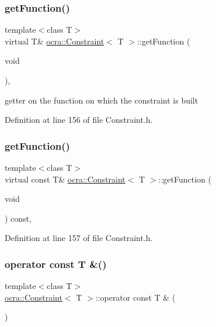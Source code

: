 \subsubsection{\texorpdfstring{get\+Function()}{getFunction()}\hspace{0.1cm}{\footnotesize\ttfamily [1/2]}}
{\footnotesize\ttfamily template$<$class T$>$ \\
virtual T\& \hyperlink{classocra_1_1Constraint}{ocra\+::\+Constraint}$<$ T $>$\+::get\+Function (\begin{DoxyParamCaption}\item[{void}]{ }\end{DoxyParamCaption})\hspace{0.3cm}{\ttfamily [inline]}, {\ttfamily [virtual]}}

getter on the function on which the constraint is built 

Definition at line 156 of file Constraint.\+h.

\hypertarget{classocra_1_1Constraint_a2bda1f6319de9c803571a232d790f497}{}\label{classocra_1_1Constraint_a2bda1f6319de9c803571a232d790f497} 
\subsubsection{\texorpdfstring{get\+Function()}{getFunction()}\hspace{0.1cm}{\footnotesize\ttfamily [2/2]}}
{\footnotesize\ttfamily template$<$class T$>$ \\
virtual const T\& \hyperlink{classocra_1_1Constraint}{ocra\+::\+Constraint}$<$ T $>$\+::get\+Function (\begin{DoxyParamCaption}\item[{void}]{ }\end{DoxyParamCaption}) const\hspace{0.3cm}{\ttfamily [inline]}, {\ttfamily [virtual]}}



Definition at line 157 of file Constraint.\+h.

\hypertarget{classocra_1_1Constraint_a4a0f49dbc4042347872429298f689091}{}\label{classocra_1_1Constraint_a4a0f49dbc4042347872429298f689091} 
\subsubsection{\texorpdfstring{operator const T \&()}{operator const T \&()}}
{\footnotesize\ttfamily template$<$class T$>$ \\
\hyperlink{classocra_1_1Constraint}{ocra\+::\+Constraint}$<$ T $>$\+::operator const T \& (\begin{DoxyParamCaption}{ }\end{DoxyParamCaption})\hspace{0.3cm}{\ttfamily [inline]}}

